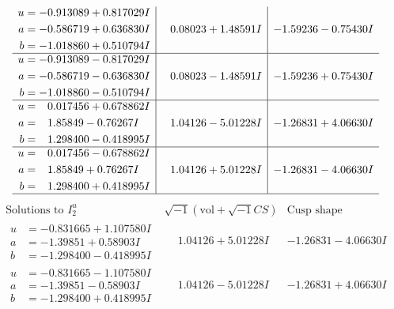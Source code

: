 \documentclass[1p]{elsarticle_modified}
\theoremstyle{definition}
\newcommand{\I}{\sqrt{-1}}
\begin{document}
$$\begin{array}{c|c|c}
\begin{aligned}
u &= -0.913089 + 0.817029 I \\
a &= -0.586719 + 0.636830 I \\
b &= -1.018860 + 0.510794 I\end{aligned}
 & \phantom{-}0.08023 + 1.48591 I & -1.59236 - 0.75430 I \\ \hline\begin{aligned}
u &= -0.913089 - 0.817029 I \\
a &= -0.586719 - 0.636830 I \\
b &= -1.018860 - 0.510794 I\end{aligned}
 & \phantom{-}0.08023 - 1.48591 I & -1.59236 + 0.75430 I \\ \hline\begin{aligned}
u &= \phantom{-}0.017456 + 0.678862 I \\
a &= \phantom{-}1.85849 - 0.76267 I \\
b &= \phantom{-}1.298400 - 0.418995 I\end{aligned}
 & \phantom{-}1.04126 - 5.01228 I & -1.26831 + 4.06630 I \\ \hline\begin{aligned}
u &= \phantom{-}0.017456 - 0.678862 I \\
a &= \phantom{-}1.85849 + 0.76267 I \\
b &= \phantom{-}1.298400 + 0.418995 I\end{aligned}
 & \phantom{-}1.04126 + 5.01228 I & -1.26831 - 4.06630 I\\
 \hline 
 \end{array}$$\newpage$$\begin{array}{c|c|c}  
\text{Solutions to }I^u_{2}& \I (\text{vol} + \sqrt{-1}CS) & \text{Cusp shape}\\
 \hline 
\begin{aligned}
u &= -0.831665 + 1.107580 I \\
a &= -1.39851 + 0.58903 I \\
b &= -1.298400 - 0.418995 I\end{aligned}
 & \phantom{-}1.04126 + 5.01228 I & -1.26831 - 4.06630 I \\ \hline\begin{aligned}
u &= -0.831665 - 1.107580 I \\
a &= -1.39851 - 0.58903 I \\
b &= -1.298400 + 0.418995 I\end{aligned}
 & \phantom{-}1.04126 - 5.01228 I & -1.26831 + 4.06630 I \\ \hline\begin{aligned}

\end{aligned}
\end{array}$$
\end{document}
